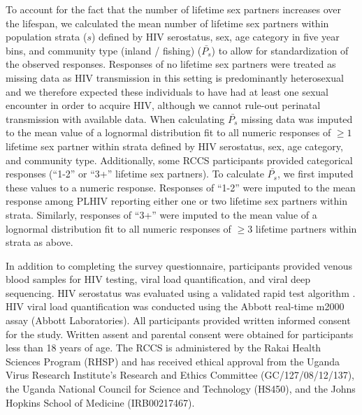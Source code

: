 \documentclass[10pt,letterpaper]{article}
\begin{document}
To account for the fact that the number of lifetime sex partners increases over the lifespan, we calculated the mean number of lifetime sex partners within population strata ($s$) defined by HIV serostatus, sex, age category in five year bins, and community type (inland / fishing) ($\bar{P_s}$) to allow for standardization of the observed responses. Responses of no lifetime sex partners were treated as missing data as HIV transmission in this setting is predominantly heterosexual \cite{ugandaAIDS2012} and we therefore expected these individuals to have had at least one sexual encounter in order to acquire HIV, although we cannot rule-out perinatal transmission with available data. When calculating $\bar{P_s}$ missing data was imputed to the mean value of a lognormal distribution fit to all numeric responses of $\ge1$ lifetime sex partner within strata defined by HIV serostatus, sex, age category, and community type. Additionally, some RCCS participants provided categorical responses (``1-2'' or ``3+'' lifetime sex partners). To calculate $\bar{P_s}$, we first imputed these values to a numeric response. Responses of ``1-2'' were imputed to the mean response among PLHIV reporting either one or two lifetime sex partners within strata. Similarly, responses of ``3+'' were imputed to the mean value of a lognormal distribution fit to all numeric responses of $\ge3$ lifetime partners within strata as above. 

In addition to completing the survey questionnaire, participants provided venous blood samples for HIV testing, viral load quantification, and viral deep sequencing. HIV serostatus was evaluated using a validated rapid test algorithm \cite{kagulire2011}. HIV viral load quantification was conducted using the Abbott real-time m2000 assay (Abbott Laboratories). All participants provided written informed consent for the study. Written assent and parental consent were obtained for participants less than 18 years of age. The RCCS is administered by the Rakai Health Sciences Program (RHSP) and has received ethical approval from the Uganda Virus Research Institute’s Research and Ethics Committee (GC/127/08/12/137), the Uganda National Council for Science and Technology (HS450), and the Johns Hopkins School of Medicine (IRB00217467).  
\end{document}

